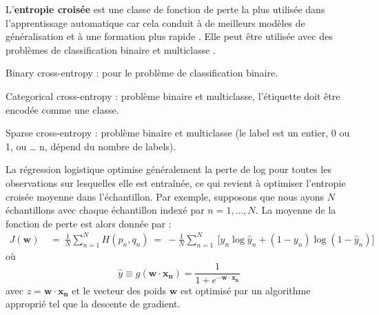 		L'\textbf{entropie croisée} est une classe de fonction de perte la plus utilisée dans l'apprentissage automatique car cela conduit à de meilleurs modèles de généralisation et à une formation plus rapide \cite{geron2017hands}.
		Elle peut être utilisée avec des problèmes de classification binaire et multiclasse \cite{goodfellow2016deep}. %
		
		\begin{list}{--}{Types d'entropie croisée :}
			\item Binary cross-entropy : pour le problème de classification binaire.
			\item Categorical cross-entropy : problème binaire et multiclasse, l'étiquette doit être encodée comme une classe.
			\item Sparse cross-entropy : problème binaire et multiclasse (le label est un entier, 0 ou 1, ou … n, dépend du nombre de labels).
		\end{list}
		La régression logistique optimise généralement la perte de log pour toutes les observations sur lesquelles elle est entraînée, ce qui revient à optimiser l'entropie croisée moyenne dans l'échantillon. Par exemple, supposons que nous ayons ${\displaystyle N}$ échantillons avec chaque échantillon indexé par ${\displaystyle n=1,\dots ,N}$. La moyenne de la fonction de perte est alors donnée par :
		\begin{equation*}
			{\displaystyle {
				\begin{aligned}
					J(\mathbf {w} )\ &=\ {\frac {1}{N}}\sum _{n=1}^{N}H(p_{n},q_{n})\ =\ -{\frac {1}{N}}\sum _{n=1}^{N}\ {\bigg [}y_{n}\log {\hat {y}}_{n}+(1-y_{n})\log(1-{\hat {y}}_{n}){\bigg ]}\,
				\end{aligned}}}
		\end{equation*}
		où
		\begin{equation*}
			{\displaystyle{\hat {y}}\equiv g(\mathbf {w} \cdot \mathbf {x_n} )={\frac {1}{1+e^{-\mathbf {w} \cdot \mathbf {x_n} }}}}
		\end{equation*}
		avec  $ z = \mathbf {w} \cdot \mathbf {x_n} $ et le vecteur des poids ${\mathbf {w} }$ est optimisé par un algorithme approprié tel que la descente de gradient.
			
		
